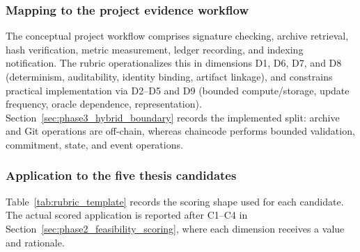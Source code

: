 \subsubsection{Mapping to the project evidence workflow}
The conceptual project workflow comprises signature checking, archive retrieval, hash verification, metric measurement,
ledger recording, and indexing notification. The rubric operationalizes this in dimensions D1, D6, D7, and D8
(determinism, auditability, identity binding, artifact linkage), and constrains practical implementation via D2--D5 and D9
(bounded compute/storage, update frequency, oracle dependence, representation). Section~\ref{sec:phase3_hybrid_boundary}
records the implemented split: archive and Git operations are off-chain, whereas chaincode performs bounded validation,
commitment, state, and event operations.

\subsubsection{Application to the five thesis candidates}
\label{sec:rubric_template_apply}
Table~\ref{tab:rubric_template} records the scoring shape used for each candidate. The actual scored application is reported
after C1--C4 in Section~\ref{sec:phase2_feasibility_scoring}, where each dimension receives a value and rationale.

\begin{table}[htbp]
\centering
\footnotesize
\renewcommand{\arraystretch}{1.12}
\caption{Feasibility rubric scoring shape. Actual scores are reported in Section~\ref{sec:phase2_feasibility_scoring}.}
\label{tab:rubric_template}
\end{table}





